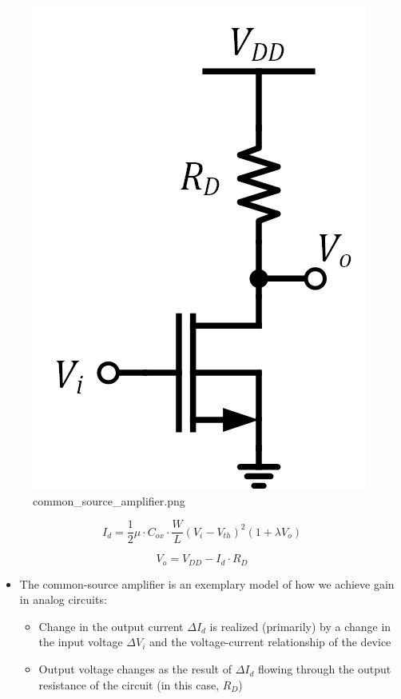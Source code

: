 \documentclass[11pt]{article}
\providecommand{\tightlist}{%
      \setlength{\itemsep}{0pt}\setlength{\parskip}{0pt}}
\begin{document}
    \begin{figure}
\centering
\includegraphics{common_source_amplifier.png}
\caption{common\_source\_amplifier.png}
\end{figure}

    \begin{equation}
I_d = \dfrac{1}{2}\mu\cdot C_{ox} \cdot \dfrac{W}{L}(V_{i}-V_{th})^2 (1+\lambda V_{o})
\end{equation}

\begin{equation}
V_o = V_{DD} - I_d\cdot R_D
\end{equation}

    \begin{itemize}
\tightlist
\item
  The common-source amplifier is an exemplary model of how we achieve
  gain in analog circuits:

  \begin{itemize}
  \tightlist
  \item
    Change in the output current \(\Delta I_d\) is realized (primarily)
    by a change in the input voltage \(\Delta V_i\) and the
    voltage-current relationship of the device
  \item
    Output voltage changes as the result of \(\Delta I_d\) flowing
    through the output resistance of the circuit (in this case, \(R_D\))
  \end{itemize}
\end{itemize}
\end{document}
